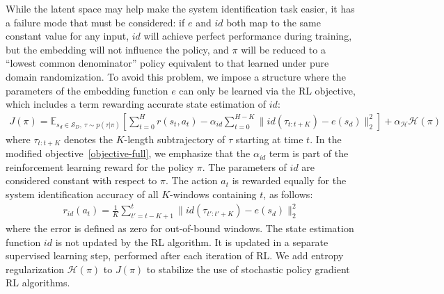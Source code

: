 \documentclass{article}
\newcommand{\E}{\mathbb{E}}
\newcommand{\TODO}[1]{\textcolor{red}{\textbf{TODO: #1}}}
\newcommand{\cH}{\mathcal{H}}
\newcommand{\cN}{\mathcal{N}}
\newcommand{\cS}{\mathcal{S}}
\DeclareMathOperator*{\argmax}{argmax}
\newcommand{\embedfn}{e}
\newcommand{\idfn}{id}
\begin{document}
While the latent space may help make the system identification task easier,
it has a failure mode that must be considered:
if $\embedfn$ and $\idfn$ both map to the same constant value for any input,
$\idfn$ will achieve perfect performance during training,
but the embedding will not influence the policy, and $\pi$ will be reduced to a ``lowest common denominator'' policy
equivalent to that learned under pure domain randomization.
To avoid this problem, we impose a structure where the parameters of the embedding function $e$
can only be learned via the RL objective, which includes a term rewarding accurate state estimation of $id$:
\begin{equation}\begin{split}
J(\pi) = 
\E_{s_d \in \cS_D,\ \tau \sim p(\tau|\pi)}
\left[
\sum_{t = 0}^H r(s_t, a_t)
- \alpha_{id} \sum_{t = 0}^{H-K} \| \idfn(\tau_{t:t+K}) - \embedfn(s_d) \|_2^2
\right]
+ \alpha_{\cH}\cH(\pi)
\label{objective-full}
\end{split}\end{equation}
where $\tau_{t:t+K}$ denotes the $K$-length subtrajectory of $\tau$ starting at time $t$.
In the modified objective~\eqref{objective-full},
we emphasize that the $\alpha_{id}$ term is part of the reinforcement learning reward
for the policy $\pi$.
The parameters of $\idfn$ are considered constant with respect to $\pi$.
The action $a_t$ is rewarded equally for the system identification accuracy
of all $K$-windows containing $t$, as follows:
\begin{equation}\begin{split}
r_{\idfn}(a_t) = \frac{1}{K}
\sum_{t' = t - K + 1}^t
\| \idfn(\tau_{t':t'+K}) - \embedfn(s_d) \|_2^2
\label{sysid-reward}
\end{split}\end{equation}
where the error is defined as zero for out-of-bound windows.
The state estimation function $\idfn$ is not updated by the RL algorithm.
It is updated in a separate supervised learning step, performed after each iteration of RL.
We add entropy regularization $\cH(\pi)$ to $J(\pi)$ to stabilize the use of stochastic policy gradient RL algorithms.
\end{document}

